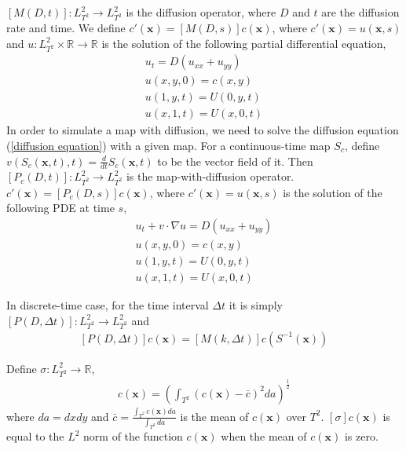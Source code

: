 \documentclass{article}
\begin{document}
$[M(D,t)]: L_{T^2}^2  \rightarrow L_{T^2}^2$ is the diffusion
operator, where $D$ and $t$ are the diffusion rate and time. We
define $c'(\mathbf{x}) = [M(D,s)]c(\mathbf{x})$, where
$c'(\mathbf{x})= u(\mathbf{x},s)$ and $u:L_{T^2}^2 \times \mathbb{R}
\rightarrow \mathbb{R} $ is the solution of the following partial
differential equation,
   \begin{eqnarray}
   \label{diffusion equation}
    u_{t} = D(u_{xx}+u_{yy})        \\
    u(x,y,0) = c(x,y)      \nonumber\\
    u(1,y,t) = U(0,y,t)    \nonumber\\
    u(x,1,t) = U(x,0,t)    \nonumber
   \end{eqnarray}
In order to simulate a map with diffusion, we need to solve the
diffusion equation (\ref{diffusion equation}) with a given map. For
a continuous-time map $S_c$, define $v(S_c(\mathbf{x},t),t) =
\frac{d}{dt}S_c(\mathbf{x},t)$ to be the vector field of it. Then
$[P_c(D,t)]:L_{T^2}^2\rightarrow L_{T^2}^2$ is the
map-with-diffusion operator. $c'(\mathbf{x}) =
[P_c(D,s)]c(\mathbf{x})$, where $c'(\mathbf{x})= u(\mathbf{x},s)$ is
the solution of the following PDE at time $s$,
   \begin{eqnarray}
   \label{map with diffusion equation}
    u_{t} + v \cdot \nabla{u}  = D(u_{xx}+u_{yy})        \\
    u(x,y,0) = c(x,y)      \nonumber\\
    u(1,y,t) = U(0,y,t)    \nonumber\\
    u(x,1,t) = U(x,0,t)    \nonumber
   \end{eqnarray}

In discrete-time case, for the time interval $\Delta t$ it is simply
$[P(D,\Delta t)]:L_{T^2}^2\rightarrow L_{T^2}^2$ and
\begin{eqnarray}
\label{PDdef}
 [P(D,\Delta t)]c(\mathbf{x})= [M(k,\Delta t)]c(S^{-1}(\mathbf{x}))
\end{eqnarray}

Define $\sigma: L_{T^2}^2\rightarrow \mathbb{R}$,
\begin{eqnarray}
[\sigma]c(\mathbf{x}) = \left(\int_{T^2}\left(  c(\mathbf{x}) -
\bar{c} \right)^2 da\right)^{\frac{1}{2}}
\end{eqnarray}
where $da = dxdy$ and $\bar{c} =  \frac{\int_{T^2}
c(\mathbf{x})da}{\int_{T^2}da}$ is the mean of $c(\mathbf{x})$ over
$T^2$. $[\sigma]c(\mathbf{x})$ is equal to the $L^2$ norm of the
function $c(\mathbf{x})$ when the mean of $c(\mathbf{x})$ is zero.
\end{document}
